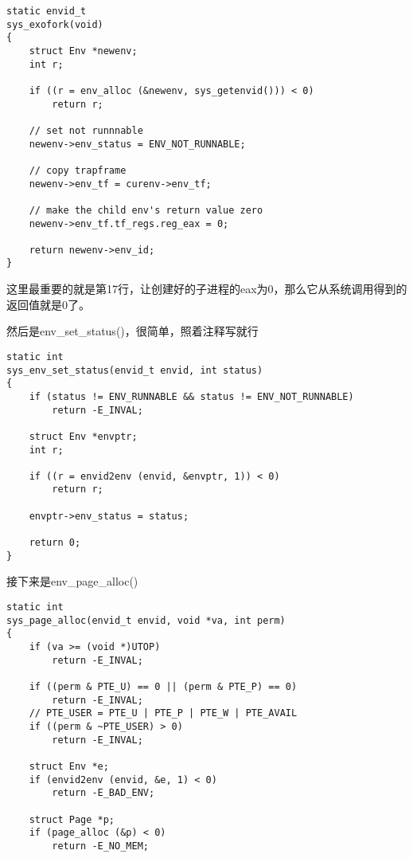 \documentclass{article}
\newcommand{\funcname}[1]{{\ttfamily \small #1}}
\begin{document}
\begin{CJK*}{UTF8}{gkai}
\begin{lstlisting}[style=ccode, title={\scriptsize \ttfamily \bfseries kern/syscall.c: sys\_exofork()}]
static envid_t
sys_exofork(void)
{
    struct Env *newenv;
    int r;

    if ((r = env_alloc (&newenv, sys_getenvid())) < 0) 
        return r;

    // set not runnnable
    newenv->env_status = ENV_NOT_RUNNABLE;

    // copy trapframe 
    newenv->env_tf = curenv->env_tf;

    // make the child env's return value zero
    newenv->env_tf.tf_regs.reg_eax = 0;

    return newenv->env_id;
}
\end{lstlisting}

这里最重要的就是第17行，让创建好的子进程的eax为0，那么它从系统调用得到的返回值就是0了。

然后是\funcname{env\_set\_status()}，很简单，照着注释写就行

\begin{lstlisting}[style=ccode, title={\scriptsize \ttfamily \bfseries kern/syscall.c: env\_set\_status()}]
static int
sys_env_set_status(envid_t envid, int status)
{
    if (status != ENV_RUNNABLE && status != ENV_NOT_RUNNABLE)
        return -E_INVAL;

    struct Env *envptr;
    int r;

    if ((r = envid2env (envid, &envptr, 1)) < 0)
        return r;

    envptr->env_status = status;

    return 0;
}
\end{lstlisting}

接下来是\funcname{env\_page\_alloc()}

\begin{lstlisting}[style=ccode, title={\scriptsize \ttfamily \bfseries kern/syscall.c: sys\_page\_alloc()}]
static int
sys_page_alloc(envid_t envid, void *va, int perm)
{
    if (va >= (void *)UTOP)
        return -E_INVAL;

    if ((perm & PTE_U) == 0 || (perm & PTE_P) == 0)
        return -E_INVAL;
    // PTE_USER = PTE_U | PTE_P | PTE_W | PTE_AVAIL
    if ((perm & ~PTE_USER) > 0)
        return -E_INVAL;

    struct Env *e;
    if (envid2env (envid, &e, 1) < 0)
        return -E_BAD_ENV;

    struct Page *p;
    if (page_alloc (&p) < 0)
        return -E_NO_MEM;


\end{lstlisting}
\end{CJK*}
\end{document}
